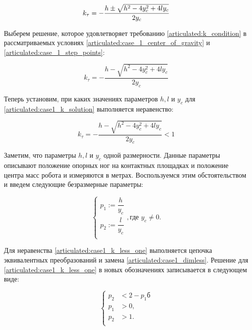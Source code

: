 \begin{equation}
\label{articulated:case1_k12}
    k_\tau = -\dfrac{h \pm \sqrt{h^2 - 4y_c^2 + 4ly_c}}{2y_c} \\
\end{equation}


Выберем решение, которое удовлетворяет требованию \ref{articulated:k_condition} в рассматриваемых условиях \ref{articulated:case_1_center_of_gravity} и \ref{articulated:case_1_step_points}:

\begin{equation}
\label{articulated:case1_k_solution}
  k_\tau = -\dfrac{h - \sqrt{h^2 - 4y_c^2 + 4ly_c}}{2y_c}
\end{equation}

Теперь установим, при каких значениях параметров $h,l$ и $y_c$ для \ref{articulated:case1_k_solution} выполняется неравенство:

\begin{equation}
\label{articulated:case1_k_less_one}
  k_\tau = -\dfrac{h - \sqrt{h^2 - 4y_c^2 + 4ly_c}}{2y_c} < 1  
\end{equation}

Заметим, что параметры $h,l$ и $y_c$ одной размерности. Данные параметры описывают положение опорных ног на контактных площадках и положение центра масс робота и измеряются в метрах. Воспользуемся этим обстоятельством и введем следующие безразмерные параметры:

\begin{equation}
\label{articulated:case1_dimless}
\left\{
\begin{alignedat}{1}
  p_1 := \dfrac{h}{y_c}\\
  p_2 := \dfrac{l}{y_c}\\
\end{alignedat}, \text{где } y_c \ne 0.
\right.
\end{equation}


Для неравенства \ref{articulated:case1_k_less_one} выполняется цепочка эквивалентных преобразований и замена \ref{articulated:case1_dimless}. Решение для \ref{articulated:case1_k_less_one} в новых обозначениях записывается в следующем виде:

\begin{equation}
\label{articulated:case1_dimless_solution}
\left\{
  \begin{alignedat}{2}
    p_2 &< 2 - p_1б\\
    p_1 &> 0,\\
    p_2 &> 1.\\
  \end{alignedat}
\right.
\end{equation}

